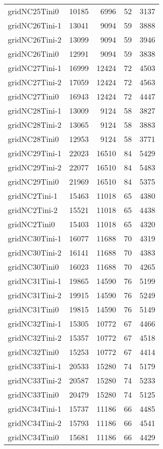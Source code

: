 \begin{longtable}{lrrrr}
gridNC25Tini0 & 10185 & 6996 & 52 & 3137 \\
gridNC26Tini-1 & 13041 & 9094 & 59 & 3888 \\
gridNC26Tini-2 & 13099 & 9094 & 59 & 3946 \\
gridNC26Tini0 & 12991 & 9094 & 59 & 3838 \\
gridNC27Tini-1 & 16999 & 12424 & 72 & 4503 \\
gridNC27Tini-2 & 17059 & 12424 & 72 & 4563 \\
gridNC27Tini0 & 16943 & 12424 & 72 & 4447 \\
gridNC28Tini-1 & 13009 & 9124 & 58 & 3827 \\
gridNC28Tini-2 & 13065 & 9124 & 58 & 3883 \\
gridNC28Tini0 & 12953 & 9124 & 58 & 3771 \\
gridNC29Tini-1 & 22023 & 16510 & 84 & 5429 \\
gridNC29Tini-2 & 22077 & 16510 & 84 & 5483 \\
gridNC29Tini0 & 21969 & 16510 & 84 & 5375 \\
gridNC2Tini-1 & 15463 & 11018 & 65 & 4380 \\
gridNC2Tini-2 & 15521 & 11018 & 65 & 4438 \\
gridNC2Tini0 & 15403 & 11018 & 65 & 4320 \\
gridNC30Tini-1 & 16077 & 11688 & 70 & 4319 \\
gridNC30Tini-2 & 16141 & 11688 & 70 & 4383 \\
gridNC30Tini0 & 16023 & 11688 & 70 & 4265 \\
gridNC31Tini-1 & 19865 & 14590 & 76 & 5199 \\
gridNC31Tini-2 & 19915 & 14590 & 76 & 5249 \\
gridNC31Tini0 & 19815 & 14590 & 76 & 5149 \\
gridNC32Tini-1 & 15305 & 10772 & 67 & 4466 \\
gridNC32Tini-2 & 15357 & 10772 & 67 & 4518 \\
gridNC32Tini0 & 15253 & 10772 & 67 & 4414 \\
gridNC33Tini-1 & 20533 & 15280 & 74 & 5179 \\
gridNC33Tini-2 & 20587 & 15280 & 74 & 5233 \\
gridNC33Tini0 & 20479 & 15280 & 74 & 5125 \\
gridNC34Tini-1 & 15737 & 11186 & 66 & 4485 \\
gridNC34Tini-2 & 15793 & 11186 & 66 & 4541 \\
gridNC34Tini0 & 15681 & 11186 & 66 & 4429 \\

\end{longtable}
